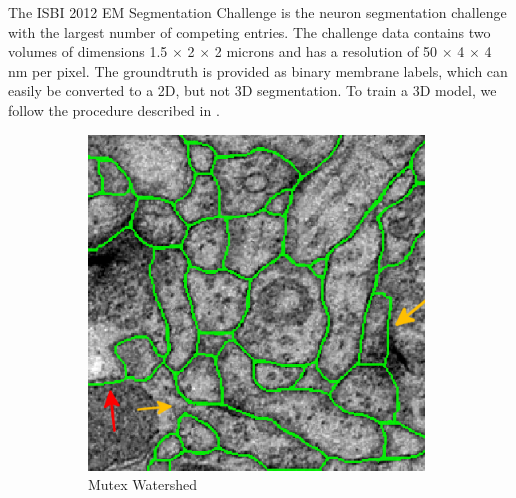 The ISBI 2012 EM Segmentation Challenge \cite{isbi2012challenge} is the neuron segmentation challenge 
with the largest number of competing entries.
The challenge data contains two volumes of dimensions 1.5 $\times$ 2 $\times$ 2 microns and 
has a resolution of 50 $\times$ 4 $\times$ 4 nm per pixel. The groundtruth is provided as binary membrane
labels, which can easily be converted to a 2D, but not 3D segmentation. To train a 3D model, we follow the procedure
described in \cite{beier2017multicut}. 
\captionsetup[subfigure]{justification=centering, singlelinecheck=off}
\begin{figure}[htp]
\centering
    \begin{subfigure}[t]{0.41 \linewidth}
        \centering
        \includegraphics[width=0.98\textwidth]{figures/MWS/images/damws_2.png}
        \caption{Mutex Watershed} \label{fig:mws1}
    \end{subfigure}\hspace{0.5cm}
    \vspace{0.3cm}
    \begin{subfigure}[t]{0.41 \linewidth}
        \centering

\end{subfigure}
\end{figure}
